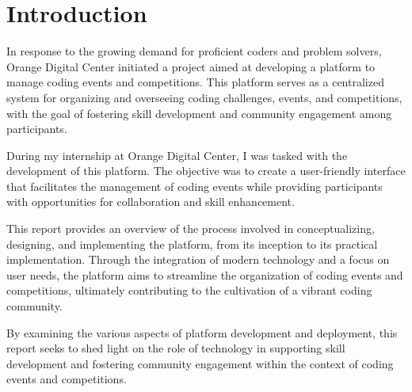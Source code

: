 \chapter*{Introduction}
\label{chap:Introduction}

In response to the growing demand for proficient coders and 
problem solvers, Orange Digital Center initiated a project aimed 
at developing a platform to manage coding events and competitions.
This platform serves as a centralized system for organizing and
overseeing coding challenges, events, and competitions, 
with the goal of fostering skill development and community
engagement among participants.\bigskip

During my internship at Orange Digital Center, I was tasked
with the development of this platform. The objective was
to create a user-friendly interface that facilitates 
the management of coding events while providing participants with
opportunities for collaboration and skill enhancement.\bigskip

This report provides an overview of the process involved in conceptualizing,
designing, and implementing the platform, from its inception to its practical
implementation. Through the integration of modern technology and a focus
on user needs, the platform aims to streamline the organization of coding events
and competitions, ultimately contributing to the cultivation of a vibrant 
coding community.\bigskip

By examining the various aspects of platform development and deployment,
this report seeks to shed light on the role of technology in supporting skill
development and fostering community engagement within the context of coding
events and competitions.
